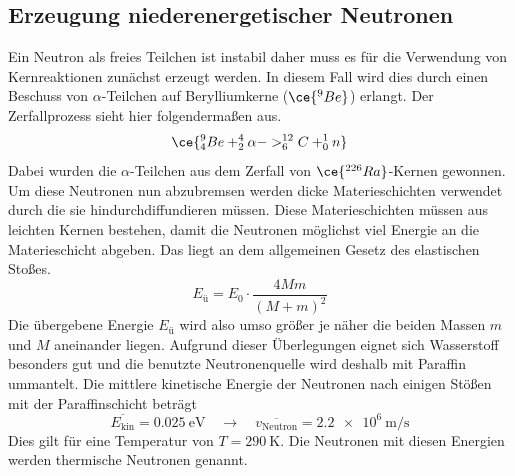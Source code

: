 \subsection{Erzeugung niederenergetischer Neutronen}
Ein Neutron als freies Teilchen ist instabil daher muss es für die Verwendung von Kernreaktionen zunächst erzeugt werden.
In diesem Fall wird dies durch einen Beschuss von $\alpha$-Teilchen auf Berylliumkerne ($\ce{^{9}Be}$) erlangt.
Der Zerfallprozess sieht hier folgendermaßen aus.
\begin{equation}
\ce{^{9}_{4}Be + ^{4}_{2}{\alpha} -> ^{12}_{6}C + ^{1}_{0}n}
\end{equation}
Dabei wurden die $\alpha$-Teilchen aus dem Zerfall von $\ce{^{226}Ra}$-Kernen gewonnen. Um diese Neutronen nun abzubremsen werden dicke Materieschichten verwendet durch die sie hindurchdiffundieren müssen.
Diese Materieschichten müssen aus leichten Kernen bestehen, damit die Neutronen möglichst viel Energie an die Materieschicht abgeben. Das liegt an dem allgemeinen Gesetz
des elastischen Stoßes.
\begin{equation}
E_{ü} = E_{0} \cdot \frac{4Mm}{(M+m)^{2}}
\end{equation}
Die übergebene Energie $E_{ü}$ wird also umso größer je näher die beiden Massen $m$ und $M$ aneinander liegen.
Aufgrund dieser Überlegungen eignet sich Wasserstoff besonders gut und die benutzte Neutronenquelle wird deshalb mit Paraffin ummantelt.
Die mittlere kinetische Energie der Neutronen nach einigen Stößen mit der Paraffinschicht beträgt
\begin{equation*}
\overline{E_{\text{kin}}} = \SI{0.025}{\electronvolt} \quad \to \quad \overline{v_{\text{Neutron}}} = \SI{2.2e6}{\meter\per\second}
\end{equation*}
Dies gilt für eine Temperatur von $T = \SI{290}{\kelvin}$. Die Neutronen mit diesen Energien werden thermische Neutronen genannt.

